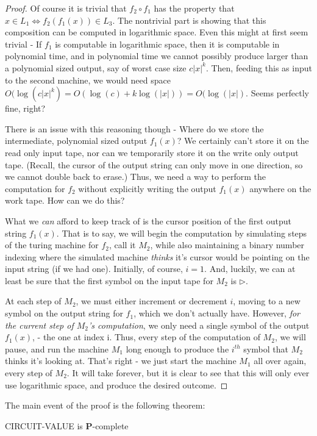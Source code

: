 \begin{proof}
    Of course it is trivial that $f_2 \circ f_1$ has the property that $x \in L_1 \iff f_2(f_1(x)) \in L_3$. The nontrivial part is showing that this composition can be computed in logarithmic space. Even this might at first seem trivial - If $f_1$ is computable in logarithmic space, then it is computable in polynomial time, and in polynomial time we cannot possibly produce larger than a polynomial sized output, say of worst case size $c|x|^k$. Then, feeding this as input to the second machine, we would need space $O(\log(c|x|^k)=O(\log(c)+k\log(|x|))=O(\log(|x|)$. Seems perfectly fine, right?
    \par There is an issue with this reasoning though - Where do we store the intermediate, polynomial sized output $f_1(x)$? We certainly can't store it on the read only input tape, nor can we temporarily store it on the write only output tape. (Recall, the cursor of the output string can only move in one direction, so we cannot double back to erase.) Thus, we need a way to perform the computation for $f_2$ without explicitly writing the output $f_1(x)$ anywhere on the work tape. How can we do this?
    \par What we \textit{can} afford to keep track of is the cursor position of the first output string $f_1(x)$. That is to say, we will begin the computation by simulating steps of the turing machine for $f_2$, call it $M_2$, while also maintaining a binary number indexing where the simulated machine \textit{thinks} it's cursor would be pointing on the input string (if we had one). Initially, of course, $i=1$. And, luckily, we can at least be sure that the first symbol on the input tape for $M_2$ is $\triangleright$.
    \par At each step of $M_2$, we must either increment or decrement $i$, moving to a new symbol on the output string for $f_1$, which we don't actually have. However, \textit{for the current step of $M_2$'s computation}, we only need a single symbol of the output $f_1(x)$, - the one at index i. Thus, every step of the computation of $M_2$, we will pause, and run the machine $M_1$ long enough to produce the $i^{th}$ symbol that $M_2$ thinks it's looking at. That's right - we just start the machine $M_1$ all over again, every step of $M_2$. It will take forever, but it is clear to see that this will only ever use logarithmic space, and produce the desired outcome.
\end{proof}
The main event of the proof is the following theorem:
\begin{theorem}
    CIRCUIT-VALUE is \textbf{P}-complete
\end{theorem}
